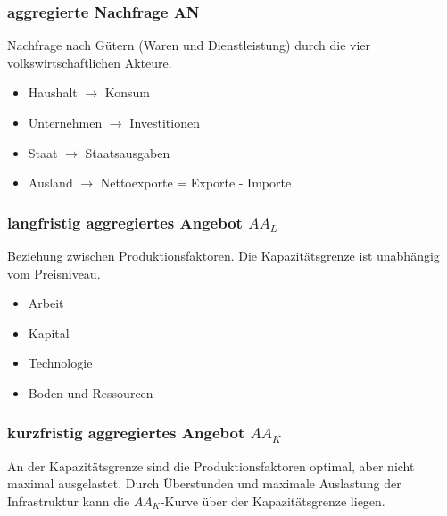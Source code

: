 	\subsubsection{aggregierte Nachfrage AN}
	Nachfrage nach Gütern (Waren und Dienstleistung) durch die vier volkswirtschaftlichen Akteure.
	\begin{itemize}
		\item Haushalt $\rightarrow$ Konsum
		\item Unternehmen $\rightarrow$ Investitionen
		\item Staat $\rightarrow$ Staatsausgaben
		\item Ausland $\rightarrow$ Nettoexporte = Exporte - Importe
	\end{itemize}
	\subsubsection{langfristig aggregiertes Angebot $AA_L$}
	Beziehung zwischen Produktionsfaktoren. Die Kapazitätsgrenze ist unabhängig vom Preisniveau.
	\begin{itemize}
		\item Arbeit
		\item Kapital
		\item Technologie
		\item Boden und Ressourcen
	\end{itemize}
	\subsubsection{kurzfristig aggregiertes Angebot $AA_K$}
	An der Kapazitätsgrenze sind die Produktionsfaktoren optimal, aber nicht maximal ausgelastet. Durch Überstunden und maximale Auslastung der Infrastruktur kann die $AA_K$-Kurve über der Kapazitätsgrenze liegen.
\clearpage
\pagebreak
